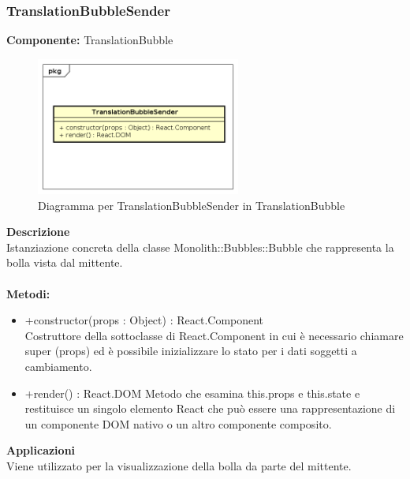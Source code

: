 \subsubsection{TranslationBubbleSender}
\textbf{Componente:}  TranslationBubble\\
   \FloatBarrier
   \begin{figure}[ht]
   \centering
   \includegraphics[width=0.6\textwidth]{img/single-TranslationBubbleSender}
   \caption{{Diagramma per TranslationBubbleSender in TranslationBubble}}
\end{figure}
\FloatBarrier
\textbf{Descrizione}\\
Istanziazione concreta della classe Monolith::Bubbles::Bubble che rappresenta la bolla vista dal mittente.
\\
\\
\textbf{Metodi:} 
\begin{itemize}
\item +constructor(props : Object) : React.Component 
\\
Costruttore della sottoclasse di React.Component in cui è necessario chiamare super (props) ed è possibile inizializzare lo stato per i dati soggetti a cambiamento.

\item +render() : React.DOM
Metodo che esamina this.props e this.state e restituisce un singolo elemento React che può essere una rappresentazione di un componente DOM nativo o un altro componente composito.

\end{itemize} 


\textbf{Applicazioni}\\
Viene utilizzato per la visualizzazione della bolla da parte del mittente. 


\clearpage

